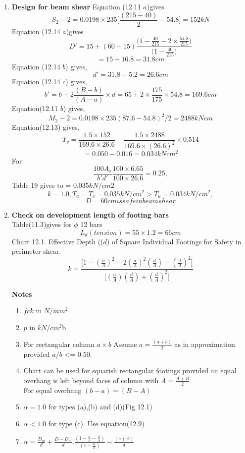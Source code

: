 \begin{enumerate}
\item  \textbf{Design for beam shear}
  Equation (12.11 $a$)gives
  $$S_2-2=0.0198\times235\Bigg[\frac{(215-40)}{2}-54.8\Bigg]=152 kN$$
  Equation (12.14 $a$)gives
  $$D'=15+(60-15)\frac{\Bigg(1-\frac{40}{215}-2\times \frac{54.8}{215}\Bigg)}{\Bigg(1-\frac{40}{215}\Bigg)}$$
  $$=15+16.8=31.8 cm$$
  Equation (12.14 $b$) gives,
  $$ d'=31.8-5.2=26.6 cm$$
  Equation (12.14 $c$) gives,
  $$b'=b+2\frac{(B-b)}{(A-a)}\times d=65+2\times \frac{175}{175}\times 54.8=169.6 cm$$
  Equation(12.11 $b$) gives,
  $$M_2-2=0.0198\times 235(87.6-54.8)^2/2=2488 kN cm$$ 
  Equation(12.13) gives,
  $$T_v=\frac{1.5\times 152}{169.6\times26.6}-\frac{1.5\times 2488}{169.6\times (26.6)^2}\times 0.514$$
  $$=0.050-0.016=0.034 kN cm^2$$
  For
  $$\frac{100A_s}{b'd'}\frac{100\times6.65}{100\times26.6}=0.25,$$
  Table 19 gives to = $0.035 kN/cm2$
  $$k=1.0, T_a=T_c=0.035 kN/cm^2>T_u=0.034 kN/cm^2,$$
$$D=60 cm is safe in beam shear$$  
  
\item  \textbf{Check on development length of footing bars}\\
Table(11.3)gives for $\phi$ 12 bars
$$L_d(tension)=55\times1.2=66cm$$
Chart 12.1. Effective Depth (($d$) of Square Individual Footings for Safety in perimeter shear.
$$k=\frac{\Bigg[1-\left(\frac{a}{A}\right)^2
-2\left(\frac{a}{A}\right)^2\left( \frac{d}{A}\right)-\left(\frac{d}{A}\right)^2\Bigg]}{\Bigg[\left(\frac{a}{A}\right)\left(\frac{d}{A}\right)+\left(\frac{d}{A}\right)^2\Bigg]}$$

\textbf{Notes}
\begin{enumerate}
\item  $fck$ in $N/mm^2$
\item $p$ in $kN/cm^2$b
\item For rectangular column $a\times b$
Assume $a=\frac{(a+b)}{2}$ as in approximation provided $a/b$ <= $0.50.$
\item Chart can be used for squarish rectangular footings provided an equal overhang is left beyond faces of column with $A=\frac{A+B}{2}$\\
For equal overhang $(b-a)=(B-A)$
\item $\alpha=1.0$ for types (a),(b) and (d)(Fig 12.1)
\item $\alpha<1.0$ for type (c). Use equation(12.9)
\item $\alpha=\frac{D_m}{d}+\frac{D-D_m}{d}.\frac{\left(1-\frac{a}{A}-\frac{d}{A}\right)}{\left(1-\frac{a}{A}\right)}-\frac{(c+\phi)}{d}$
\end{enumerate}


\end{enumerate}

